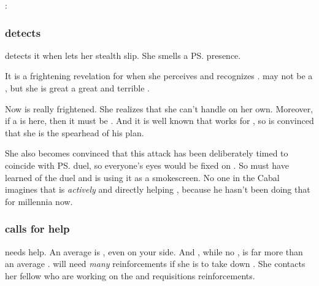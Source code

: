 \begin{prose}
  \Takestsha: 
\end{prose}






\subsubsection{\Achsah detects \Nzessuacrith}
\Achsah detects it when \Nzessuacrith lets her stealth slip. 
She smells a \ps{\dragon}{} presence. 

It is a frightening  revelation for \Achsah when she perceives and recognizes \Nzessuacrith.
\Nzessuacrith may not be a \shaeeroth, but she is great a great and terrible \dragon. 

Now \Achsah{} is really frightened. 
She realizes that she can't handle \Nzessuacrith{} on her own. 
Moreover, if a \dragon{} is here, then it must be . 
And it is well known that \Nzessuacrith{} works for \Secherdamon, so \Achsah{} is convinced that she is the spearhead of his plan. 

She also becomes convinced that this attack has been deliberately timed to coincide with \ps{\Teshrial} duel, so everyone's eyes would be fixed on \Malcur. 
So \Secherdamon{} must have learned of the duel and is using it as a smokescreen. 
No one in the Cabal imagines that \Ishnaruchaefir{} is \emph{actively} and directly helping \Secherdamon, because he hasn't been doing that for millennia now. 






\subsubsection{\Achsah calls for help}
\Achsah{} needs help. 
An average \dragon is , even  on your side.
And \Nzessuacrith, while no \shaeeroth, is far more than an average \dragon. 
\Achsah will need \emph{many} reinforcements if she is to take down \Nzessuacrith. 
She contacts her fellow \resphain who are working on the  and requisitions reinforcements. 

